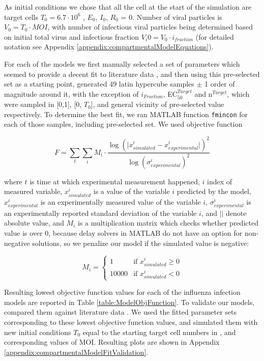 As initial conditions we chose that all the cell at the start of the simulation are target cells $T_0 = 6.7 \cdot 10^6$ \cite{saenz2010dynamics}, $E_0$, $I_0$, $R_0$ = 0. Number of viral particles is $V_0 = T_0 \cdot MOI$, with number of infectious viral particles being determined based on initial total virus and infectious fraction $V_i0 = V_0 \cdot i_{fraction}$ (for detailed notation see Appendix \ref{appendix:compartmentalModelEquations}).

For each of the models we first manually selected a set of parameters which seemed to provide a decent fit to literature data \cite{rudiger2019multiscale}, and then using this pre-selected set as a starting point, generated 49 latin hypercube samples $\pm$ 1 order of magnitude around it, with the exception of $i_{Fraction}$, EC$_{50}^{Target}$ and n$^{Target}$, which were sampled in [0,1], [0, $T_0$], and general vicinity of pre-selected value respectively. To determine the best fit, we ran MATLAB function \texttt{fmincon} for each of those samples, including pre-selected set. We used objective function

\begin{equation}
F = \sum_t \sum_i M_i \cdot \frac{\log (\big| x^i_{simulated} - x^i_{experimental} \big|)^2}{\log (\sigma^i_{experimental})^2}
\end{equation}

where $t$ is time at which experimental measurement happened, $i$ index of measured variable, $x^i_{simulated}$ is a value of the variable $i$ predicted by the model, $x^i_{experimental}$ is an experimentally measured value of the variable $i$, $\sigma^i_{experimental}$ is an experimentally reported standard deviation of the variable $i$, and $||$ denote absolute value, and $M_i$ is a multiplication matrix which checks whether predicted value is over 0, because delay solvers in MATLAB do not have an option for non-negative solutions, so we penalize our model if the simulated value is negative:

\begin{equation}
M_i =
\begin{cases}
1 & \mbox{if } x^i_{simulated} \ge 0\\
10000 & \mbox{if } x^i_{simulated} < 0
\end{cases}
\end{equation}

Resulting lowest objective function values for each of the influenza infection models are reported in Table \ref{table:ModelObjFunction}. To validate our models, compared them against literature data \cite{schulze2009infection}. We used the fitted parameter sets corresponding to these lowest objective function values, and simulated them with new initial conditions $T_0$ equal to the starting target cell numbers in \cite{schulze2009infection}, and corresponding values of MOI. Resulting plots are shown in Appendix \ref{appendix:compartmentalModelFitValidation}.

